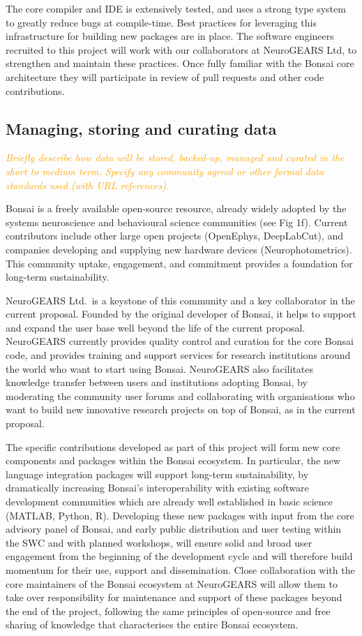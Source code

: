 \documentclass[a4paper,11pt]{article}
\begin{document}
The core compiler and IDE is extensively tested, and uses a strong type system
to greatly reduce bugs at compile-time. Best practices for leveraging this
infrastructure for building new packages are in place. The software engineers
recruited to this project will work with our collaborators at NeuroGEARS Ltd,
to strengthen and maintain these practices. Once fully familiar with the Bonsai
core architecture they will participate in review of pull requests and other
code contributions.

\subsection{Managing, storing and curating data}

\textcolor{orange}{\textit{Briefly describe how data will be stored, backed-up, managed and curated in the short to medium term. Specify any community agreed or other formal data standards used (with URL references).}}

Bonsai is a freely available open-source resource, already widely adopted by
the systems neuroscience and behavioural science communities (see Fig 1f).
Current contributors include other large open projects (OpenEphys, DeepLabCut),
and companies developing and supplying new hardware devices
(Neurophotometrics). This community uptake, engagement, and commitment provides
a foundation for long-term sustainability.

NeuroGEARS Ltd.\ is a keystone of this community and a key collaborator in the
current proposal. Founded by the original developer of Bonsai, it helps to
support and expand the user base well beyond the life of the current proposal.
NeuroGEARS currently provides quality control and curation for the core Bonsai
code, and provides training and support services for research institutions
around the world who want to start using Bonsai. NeuroGEARS also facilitates
knowledge transfer between users and institutions adopting Bonsai, by
moderating the community user forums and collaborating with organisations who
want to build new innovative research projects on top of Bonsai, as in the
current proposal.

The specific contributions developed as part of this project will form new core
components and packages within the Bonsai ecosystem. In particular, the new
language integration packages will support long-term sustainability, by
dramatically increasing Bonsai's interoperability with existing software
development communities which are already well established in basic science
(MATLAB, Python, R). Developing these new packages with input from the core
advisory panel of Bonsai, and early public distribution and user testing within
the SWC and with planned workshops, will ensure solid and broad user engagement
from the beginning of the development cycle and will therefore build momentum
for their use, support and dissemination. Close collaboration with the core
maintainers of the Bonsai ecosystem at NeuroGEARS will allow them to take over
responsibility for maintenance and support of these packages beyond the end of
the project, following the same principles of open-source and free sharing of
knowledge that characterises the entire Bonsai ecosystem.
\end{document}
